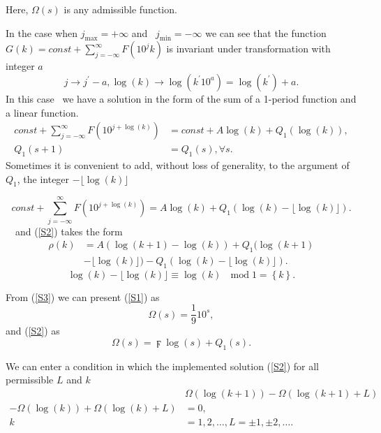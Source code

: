 \documentclass[titlepage,fleqn]{article}%
\begin{document}
\noindent Here, $\Omega(s)$ is any admissible function.

In the case when $j_{\max}=+\infty$ and \ $j_{\min}=-\infty$ we can see that
the function $G(k)=const+%
{\displaystyle\sum\limits_{j=-\infty}^{\infty}}
F(10^{j}k)$ is invariant under transformation with integer $a$
\[
j\rightarrow j^{\prime}-a,\log(k)\rightarrow\log(k^{\prime}10^{a}%
)=\log(k^{\prime})+a.
\]
In this case \ we have a solution in the form of the sum of a 1-period
function and a linear function.%
\begin{align*}
const+%
{\displaystyle\sum\limits_{j=-\infty}^{\infty}}
F(10^{j+\log(k)})  &  =const+A\log(k)+Q_{1}(\log(k)),\\
Q_{1}(s+1)  &  =Q_{1}(s),\forall s.\text{ }%
\end{align*}
Sometimes it is convenient to add, without loss of generality, to the argument
of $Q_{1}$, the integer $-\lfloor\log(k)\rfloor$%

\[
const+%
{\displaystyle\sum\limits_{j=-\infty}^{\infty}}
F(10^{j+\log(k)})=A\log(k)+Q_{1}(\log(k)-\lfloor\log(k)\rfloor).
\]
\ \ and (\ref{S2}) takes the form%
\begin{align}
\rho(k)  &  =A\left(  \log(k+1)-\log(k)\right)  +Q_{1}(\log(k+1)\label{S2a}\\
&  -\lfloor\log(k)\rfloor)-Q_{1}(\log(k)-\lfloor\log(k)\rfloor).\nonumber
\end{align}%
\[
\log(k)-\lfloor\log(k)\rfloor\equiv\log(k)\text{ }\operatorname{mod}\text{
}1=\left\{  k\right\}  .
\]


From (\ref{S3}) we can present (\ref{S1}) as%
\[
\Omega(s)=\frac{1}{9}10^{s},
\]
and (\ref{S2}) as%
\begin{equation}
\Omega(s)=\digamma\log(s)+Q_{1}(s). \label{S2b}%
\end{equation}


We can enter a condition in which the implemented solution (\ref{S2}) for all
permissible $L$ and $k$%
\begin{align}
&  \Omega(\log(k+1))-\Omega(\log(k+1)+L)\label{S2c}\\
-\Omega(\log(k))+\Omega(\log(k)+L)  &  =0,\nonumber\\
k  &  =1,2,\ldots,L=\pm1,\pm2,\ldots.\nonumber
\end{align}
\end{document}
